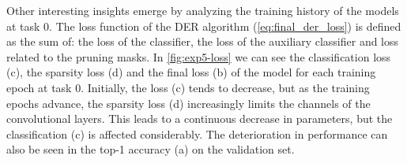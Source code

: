 Other interesting insights emerge by analyzing the training history of the models at task 0. The loss function of the DER algorithm (\autoref{eq:final_der_loss}) is defined as the sum of: the loss of the classifier, the loss of the auxiliary classifier and loss related to the pruning masks. In \autoref{fig:exp5-loss} we can see the classification loss (c), the sparsity loss (d) and the final loss (b) of the model for each training epoch at task 0. Initially, the loss (c) tends to decrease, but as the training epochs advance, the sparsity loss (d) increasingly limits the channels of the convolutional layers. This leads to a continuous decrease in parameters, but the classification (c) is affected considerably. The deterioration in performance can also be seen in the top-1 accuracy (a) on the validation set.


\begin{figure}[H]
	\centering
    
    
    

\end{figure}
